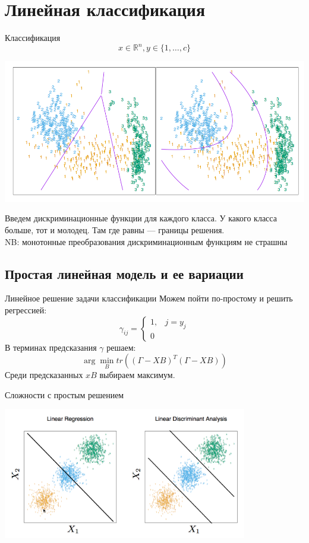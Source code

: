 \documentclass[14pt, fleqn, xcolor={dvipsnames, table}]{beamer}
\begin{document}
\section{Линейная классификация}
\begin{frame}{Классификация}
$$
x \in \mathbb{R}^n, y \in \{1,\ldots, c\}
$$
\begin{center}
\includegraphics[height=0.4\textheight]{4_1.png}
\end{center}
\small
Введем дискриминационные функции для каждого класса. У какого класса больше, тот и молодец. Там где равны --- границы решения.\\
NB: монотонные преобразования дискриминационным функциям не страшны
\end{frame}

\subsection{Простая линейная модель и ее вариации}
\begin{frame}{Линейное решение задачи классификации}
Можем пойти по-простому и решить регрессией:
$$
\gamma_{ij} = \left\{\begin{array}{ll}
1,& j = y_j \\
0 
\end{array}\right.
$$
В терминах предсказания $\gamma$ решаем:
$$
\arg \min_B tr\left((\Gamma - XB)^T(\Gamma - XB)\right)
$$
Среди предсказанных $xB$ выбираем максимум.
\end{frame}

\begin{frame}{Сложности с простым решением}\small
\begin{center}
\includegraphics[width=0.8\textwidth]{4_2.png}
\end{center}
\end{frame}
\end{document}

